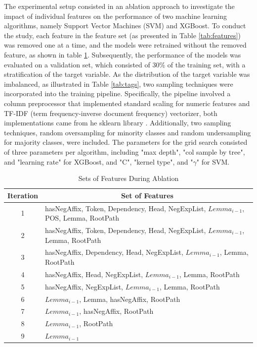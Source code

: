 The experimental setup consisted in an ablation approach to investigate the impact of individual features on the performance of two machine learning algorithms, namely Support Vector Machines (SVM) and XGBoost. To conduct the study, each feature in the feature set (as presented in Table \ref{tab:features}) was removed one at a time, and the models were retrained without the removed feature, as shown in table \ref{tab:ablation}. Subsequently, the performance of the models was evaluated on a validation set, which consisted of 30\% of the training set, with a stratification of the target variable. As the distribution of the target variable was imbalanced, as illustrated in Table \ref{tab:tags}, two sampling techniques were incorporated into the training pipeline. Specifically, the pipeline involved a column preprocessor that implemented standard scaling for numeric features and TF-IDF (term frequency-inverse document frequency) vectorizer, both implementations came from he sklearn library \cite{scikit-learn}. Additionally, two sampling techniques, random oversampling for minority classes and random undersampling for majority classes, were included. The parameters for the grid search consisted of three parameters per algorithm, including "max depth", "col sample by tree", and "learning rate" for XGBoost, and "C", "kernel type", and "$\gamma$" for SVM.

\begin{table}[!ht]
\centering
\caption{\label{tab:ablation} Sets of Features During Ablation}
\begin{tabular}{cl}
\hline
\textbf{Iteration} & \multicolumn{1}{c}{\textbf{Set of Features}} \\
\hline
1 & hasNegAffix, Token, Dependency, Head, NegExpList, $Lemma_{i-1}$, POS, Lemma, RootPath \\
2 & hasNegAffix, Token, Dependency, Head, NegExpList, $Lemma_{i-1}$, Lemma, RootPath \\
3 & hasNegAffix, Dependency, Head, NegExpList, $Lemma_{i-1}$, Lemma, RootPath \\
4 & hasNegAffix, Head, NegExpList, $Lemma_{i-1}$, Lemma, RootPath \\
5 & hasNegAffix, NegExpList, $Lemma_{i-1}$, Lemma, RootPath \\
6 & $Lemma_{i-1}$, Lemma, hasNegAffix, RootPath \\
7 & $Lemma_{i-1}$, hasNegAffix, RootPath \\
8 & $Lemma_{i-1}$, RootPath \\
9 & $Lemma_{i-1}$ \\
\hline
\end{tabular}
\end{table}


